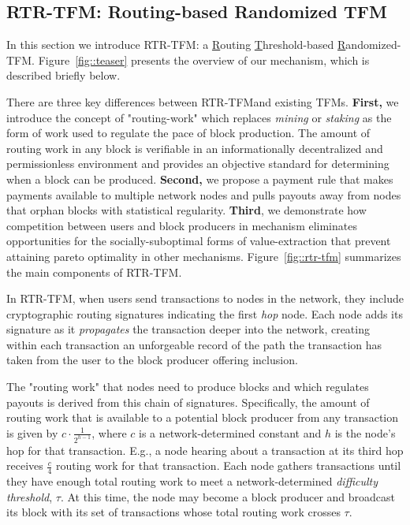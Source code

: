 \documentclass[sigconf,anonymous]{aamas}
\newcommand{\ourTFM}{\textsc{RTR-TFM}}
\begin{document}
\subsection*{RTR-TFM: Routing-based Randomized TFM}

In this section we introduce \ourTFM: a \underline{R}outing \underline{T}hreshold-based \underline{R}andomized-TFM. Figure~\ref{fig::teaser} presents the overview of our mechanism, which is described briefly below.

There are three key differences between \ourTFM and  existing TFMs. \textbf{First,} we introduce the concept of "routing-work" which replaces \textit{mining} or \textit{staking} as the form of work used to regulate the pace of block production. The amount of routing work in any block is verifiable in an informationally decentralized and permissionless environment and provides an objective standard for determining when a block can be produced. \textbf{Second,} we propose a payment rule that makes payments available to multiple network nodes and pulls payouts away from nodes that orphan blocks with statistical regularity. \textbf{Third}, we demonstrate how competition between users and block producers in mechanism eliminates opportunities for the socially-suboptimal forms of value-extraction that prevent attaining pareto optimality in other mechanisms. Figure~\ref{fig::rtr-tfm} summarizes the main components of \ourTFM. 

In \ourTFM, when users send transactions to nodes in the network, they include cryptographic routing signatures indicating the first \emph{hop} node. Each node adds its signature as it \emph{propagates} the transaction deeper into the network, creating within each transaction an unforgeable record of the path the transaction has taken from the user to the block producer offering inclusion.

The "routing work" that nodes need to produce blocks and which regulates payouts is derived from this chain of signatures. Specifically, the amount of routing work that is available to a potential block producer from any transaction is given by $c\cdot \frac{1}{2^{h-1}}$, where $c$ is a network-determined constant and $h$ is the node's hop for that transaction. E.g., a node hearing about a transaction at its third hop receives $\frac{c}{4}$ routing work for that transaction. Each node gathers transactions until they have enough total routing work to meet a network-determined \textit{difficulty} \textit{threshold}, $\tau$. At this time, the node may become a block producer and broadcast its block with its set of transactions whose total routing work crosses $\tau$.
\end{document}
